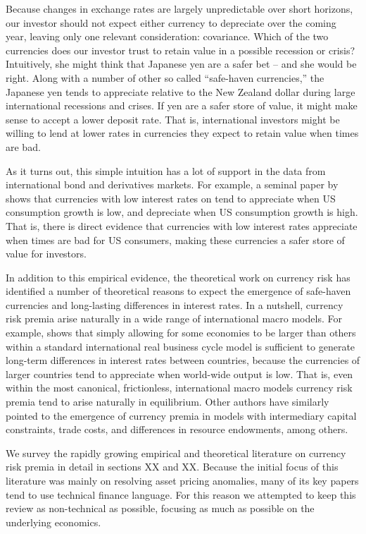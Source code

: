 \documentclass{ar-1col}
\begin{document}
Because changes in exchange rates are largely unpredictable over short
horizons, our investor should not expect either currency to depreciate
over the coming year, leaving only one relevant consideration:
covariance. Which of the two currencies does our investor trust to
retain value in a possible recession or crisis? Intuitively, she might
think that Japanese yen are a safer bet -- and she would be right.
Along with a number of other so called ``safe-haven currencies,'' the
Japanese yen tends to appreciate relative to the New Zealand dollar
during large international recessions and crises. If yen are a safer
store of value, it might make sense to accept a lower deposit rate.
That is, international investors might be willing to lend at lower
rates in currencies they expect to retain value when times are bad.

As it turns out, this simple intuition has a lot of support in the
data from international bond and derivatives markets. For example, a
seminal paper by \citet{LustigVerdelhan2007} shows that currencies
with low interest rates on tend to appreciate when US consumption
growth is low, and depreciate when US consumption growth is high. That
is, there is direct evidence that currencies with low interest rates
appreciate when times are bad for US consumers, making these
currencies a safer store of value for investors.

In addition to this empirical evidence, the theoretical work on
currency risk has identified a number of theoretical reasons to expect
the emergence of safe-haven currencies and long-lasting differences in
interest rates. In a nutshell, currency risk premia arise naturally in
a wide range of international macro models. For example,
\citet{Hassan2013} shows that simply allowing for some economies to be
larger than others within a standard international real business cycle
model is sufficient to generate long-term differences in interest
rates between countries, because the currencies of larger countries
tend to appreciate when world-wide output is low. That is, even within
the most canonical, frictionless, international macro models currency
risk premia tend to arise naturally in equilibrium. Other authors have
similarly pointed to the emergence of currency premia in models with
intermediary capital constraints, trade costs, and differences in
resource endowments, among others.


We survey the rapidly growing empirical and theoretical literature on
currency risk premia in detail in sections XX and XX. Because the
initial focus of this literature was mainly on resolving asset pricing
anomalies, many of its key papers tend to use technical finance
language. For this reason we attempted to keep this review as
non-technical as possible, focusing as much as possible on the
underlying economics.
\end{document}
